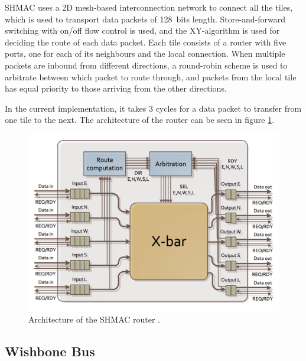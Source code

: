 SHMAC uses a 2D mesh-based interconnection network to connect all the tiles, which is used
to transport data packets of 128~bits length.
Store-and-forward switching with on/off flow control is used, and the XY-algorithm is used for deciding the route of each data packet.
Each tile consists of a router with five ports, one for each of its neighbours and the local connection.
When multiple packets are inbound from different directions, a round-robin scheme is used to arbitrate between which
packet to route through, and packets from the local tile has equal priority to those arriving from the other directions.

In the current implementation, it takes 3 cycles for a data packet to transfer from one tile to the next. 
The architecture of the router can be seen in figure \ref{fig:shmac-router}.

\begin{figure}[htb]
    \centering
    \includegraphics[width=1.0\textwidth]{Figures/Heterogeneous/SHMACRouter}
    \caption{Architecture of the SHMAC router \cite{shmac-plan}.}
    \label{fig:shmac-router}
\end{figure}

\subsection{Wishbone Bus}


